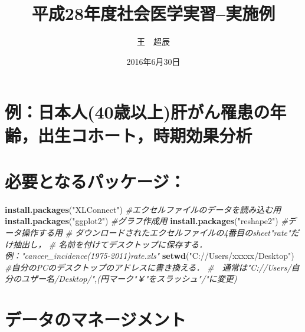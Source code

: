 \documentclass[11pt,]{article}
\title{平成28年度社会医学実習--実施例}
\author{王　超辰}
\date{2016年6月30日}
\newenvironment{Shaded}{\begin{snugshade}}{\end{snugshade}}
\newcommand{\KeywordTok}[1]{\textcolor[rgb]{0.13,0.29,0.53}{\textbf{{#1}}}}
\newcommand{\StringTok}[1]{\textcolor[rgb]{0.31,0.60,0.02}{{#1}}}
\newcommand{\CommentTok}[1]{\textcolor[rgb]{0.56,0.35,0.01}{\textit{{#1}}}}
\newcommand{\NormalTok}[1]{{#1}}
\begin{document}
\maketitle

\section{例：日本人(40歳以上)肝がん罹患の年齢，出生コホート，時期効果分析}\label{40}

\section{必要となるパッケージ：}

\begin{Shaded}
\begin{Highlighting}[]
\KeywordTok{install.packages}\NormalTok{(}\StringTok{"XLConnect"}\NormalTok{) }\CommentTok{#エクセルファイルのデータを読み込む用}
\KeywordTok{install.packages}\NormalTok{(}\StringTok{"ggplot2"}\NormalTok{) }\CommentTok{#グラフ作成用}
\KeywordTok{install.packages}\NormalTok{(}\StringTok{"reshape2"}\NormalTok{) }\CommentTok{#データ操作する用}
\CommentTok{#  ダウンロードされたエクセルファイルの4番目のsheet"rate"だけ抽出し，}
\CommentTok{#  名前を付けてデスクトップに保存する．例："cancer_incidence(1975-2011)rate.xls"}
\KeywordTok{setwd}\NormalTok{(}\StringTok{"C://Users/xxxxx/Desktop"}\NormalTok{) }\CommentTok{#自分のPCのデスクトップのアドレスに書き換える．}
\CommentTok{#　通常は"C://Users/自分のユザー名/Desktop/",(円マーク"￥"をスラッシュ"/"に変更)}
\end{Highlighting}
\end{Shaded}

\section{データのマネージメント}
\end{document}
